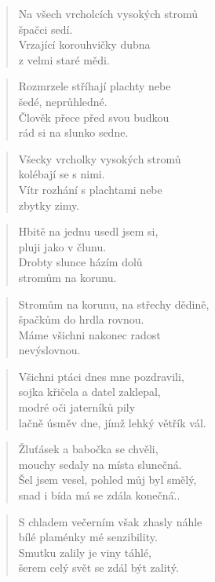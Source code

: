 \documentclass{book}
\begin{document}
\newpage
{}
\begin{verse}
Na všech vrcholcích vysokých stromů\\
špačci sedí.\\
Vrzající korouhvičky dubna\\
z velmi staré mědi.
\end{verse}
\begin{verse}
Rozmrzele stříhají plachty nebe\\
šedé, neprůhledné.\\
Člověk přece před svou budkou\\
rád si na slunko sedne.
\end{verse}
\begin{verse}
Všecky vrcholky vysokých stromů\\
kolébají se s nimi.\\
Vítr rozhání s plachtami nebe\\
zbytky zimy.
\end{verse}
\begin{verse}
Hbitě na jednu usedl jsem si,\\
pluji jako v člunu.\\
Drobty slunce házím dolů\\
stromům na korunu.
\end{verse}
\begin{verse}
Stromům na korunu, na střechy dědině,\\
špačkům do hrdla rovnou.\\
Máme všichni nakonec radost\\
nevýslovnou.
\end{verse}
\newpage
{}
\begin{verse}
Všichni ptáci dnes mne pozdravili,\\
sojka křičela a datel zaklepal,\\
modré oči jaterníků pily\\
lačně úsměv dne, jímž lehký větřík vál.
\end{verse}
\begin{verse}
Žluťásek a babočka se chvěli,\\
mouchy sedaly na místa slunečná.\\
Šel jsem vesel, pohled můj byl smělý,\\
snad i bída má se zdála konečná\...
\end{verse}
\begin{verse}
S chladem večerním však zhasly náhle\\
bílé plaménky mé senzibility.\\
Smutku zalily je viny táhlé,\\
šerem celý svět se zdál být zalitý.
\end{verse}
\end{document}
